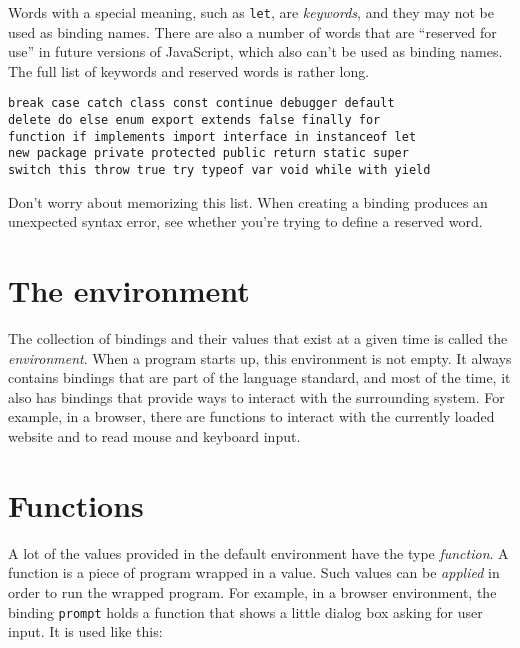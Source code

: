 Words with a special meaning, such as \lstinline`let`, are \emph{keywords}, and they may not be used as binding names. There are also a number of words that are ``reserved for use'' in future versions of JavaScript, which also can't be used as binding names. The full list of keywords and reserved words is rather long.

\begin{lstlisting}
break case catch class const continue debugger default
delete do else enum export extends false finally for
function if implements import interface in instanceof let
new package private protected public return static super
switch this throw true try typeof var void while with yield
\end{lstlisting}
\noindent{}

Don't worry about memorizing this list. When creating a binding produces an unexpected syntax error, see whether you're trying to define a reserved word.

\section{The environment}

The collection of bindings and their values that exist at a given time is called the \emph{environment}. When a program starts up, this environment is not empty. It always contains bindings that are part of the language standard, and most of the time, it also has bindings that provide ways to interact with the surrounding system. For example, in a browser, there are functions to interact with the currently loaded website and to read mouse and keyboard input.

\section{Functions}

A lot of the values provided in the default environment have the type \emph{function}. A function is a piece of program wrapped in a value. Such values can be \emph{applied} in order to run the wrapped program. For example, in a browser environment, the binding \lstinline`prompt` holds a function that shows a little dialog box asking for user input. It is used like this:

